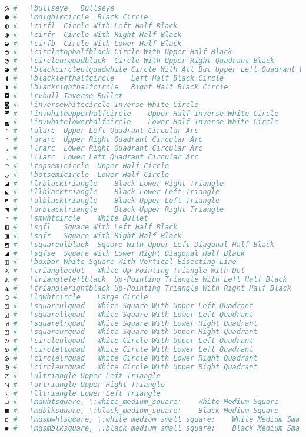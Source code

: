 \begin{lstlisting}[language=Julia, linewidth=\textwidth]
◎ #   \bullseye   Bullseye
● #   \mdlgblkcircle  Black Circle
◐ #   \cirfl  Circle With Left Half Black
◑ #   \cirfr  Circle With Right Half Black
◒ #   \cirfb  Circle With Lower Half Black
◓ #   \circletophalfblack Circle With Upper Half Black
◔ #   \circleurquadblack  Circle With Upper Right Quadrant Black
◕ #   \blackcircleulquadwhite Circle With All But Upper Left Quadrant Black
◖ #   \blacklefthalfcircle    Left Half Black Circle
◗ #   \blackrighthalfcircle   Right Half Black Circle
◘ #   \rvbull Inverse Bullet
◙ #   \inversewhitecircle Inverse White Circle
◚ #   \invwhiteupperhalfcircle    Upper Half Inverse White Circle
◛ #   \invwhitelowerhalfcircle    Lower Half Inverse White Circle
◜ #   \ularc  Upper Left Quadrant Circular Arc
◝ #   \urarc  Upper Right Quadrant Circular Arc
◞ #   \lrarc  Lower Right Quadrant Circular Arc
◟ #   \llarc  Lower Left Quadrant Circular Arc
◠ #   \topsemicircle  Upper Half Circle
◡ #   \botsemicircle  Lower Half Circle
◢ #   \lrblacktriangle    Black Lower Right Triangle
◣ #   \llblacktriangle    Black Lower Left Triangle
◤ #   \ulblacktriangle    Black Upper Left Triangle
◥ #   \urblacktriangle    Black Upper Right Triangle
◦ #   \smwhtcircle    White Bullet
◧ #   \sqfl   Square With Left Half Black
◨ #   \sqfr   Square With Right Half Black
◩ #   \squareulblack  Square With Upper Left Diagonal Half Black
◪ #   \sqfse  Square With Lower Right Diagonal Half Black
◫ #   \boxbar White Square With Vertical Bisecting Line
◬ #   \trianglecdot   White Up-Pointing Triangle With Dot
◭ #   \triangleleftblack  Up-Pointing Triangle With Left Half Black
◮ #   \trianglerightblack Up-Pointing Triangle With Right Half Black
◯ #   \lgwhtcircle    Large Circle
◰ #   \squareulquad   White Square With Upper Left Quadrant
◱ #   \squarellquad   White Square With Lower Left Quadrant
◲ #   \squarelrquad   White Square With Lower Right Quadrant
◳ #   \squareurquad   White Square With Upper Right Quadrant
◴ #   \circleulquad   White Circle With Upper Left Quadrant
◵ #   \circlellquad   White Circle With Lower Left Quadrant
◶ #   \circlelrquad   White Circle With Lower Right Quadrant
◷ #   \circleurquad   White Circle With Upper Right Quadrant
◸ #   \ultriangle Upper Left Triangle
◹ #   \urtriangle Upper Right Triangle
◺ #   \lltriangle Lower Left Triangle
◻ #   \mdwhtsquare, \:white_medium_square:    White Medium Square
◼ #   \mdblksquare, \:black_medium_square:    Black Medium Square
◽ #   \mdsmwhtsquare, \:white_medium_small_square:    White Medium Small Square
◾ #   \mdsmblksquare, \:black_medium_small_square:    Black Medium Small Square

\end{lstlisting}
